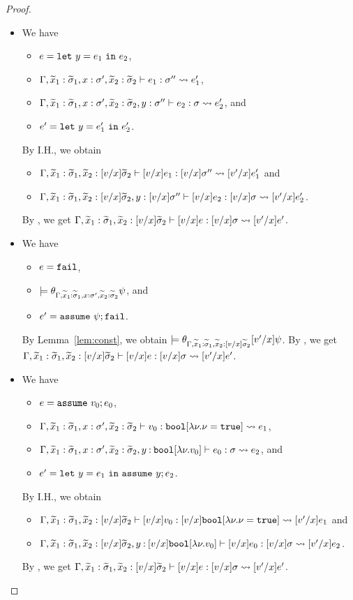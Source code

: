 \begin{proof}
\begin{itemize}
\item[] 
We have
\begin{itemize}
\item \(e=\mathtt{let~}y=e_1\mathtt{~in~}{e_2}\),
\item \(\Gamma,\widetilde{x}_1:\widetilde{\sigma}_1,x:\sigma',\widetilde{x}_2:\widetilde{\sigma}_2 \vdash e_1 : \sigma'' \leadsto e_1'\),
\item \(\Gamma,\widetilde{x}_1:\widetilde{\sigma}_1,x:\sigma',\widetilde{x}_2:\widetilde{\sigma}_2,y:\sigma'' \vdash e_2 : \sigma \leadsto e_2'\), and
\item \(e'=\mathtt{let~}y=e_1'\mathtt{~in~}{e_2'}\).
\end{itemize}
By I.H., we obtain
\begin{itemize}
\item \(\Gamma,\widetilde{x}_1:\widetilde{\sigma}_1,\widetilde{x}_2:[v/x]\widetilde{\sigma}_2 \vdash [v/x]e_1 : [v/x]\sigma'' \leadsto [v'/x]e_1'\) and
\item \(\Gamma,\widetilde{x}_1:\widetilde{\sigma}_1,\widetilde{x}_2:[v/x]\widetilde{\sigma}_2,y:[v/x]\sigma'' \vdash [v/x]e_2 : [v/x]\sigma \leadsto [v'/x]e_2'\).
\end{itemize}
By , we get
\(\Gamma,\widetilde{x}_1:\widetilde{\sigma}_1,\widetilde{x}_2:[v/x]\widetilde{\sigma}_2 \vdash [v/x]e : [v/x]\sigma \leadsto [v'/x]e'\).

\item[] 
We have
\begin{itemize}
\item \(e=\mathtt{fail}\),
\item \(\models \theta_{\Gamma,\widetilde{x}_1:\widetilde{\sigma}_1,x:\sigma',\widetilde{x}_2:\widetilde{\sigma}_2}\psi\), and
\item \(e'=\mathtt{assume~}\psi; \mathtt{fail}\).
\end{itemize}
By Lemma~\ref{lem:const}, we obtain
\(\models \theta_{\Gamma,\widetilde{x}_1:\widetilde{\sigma}_1,\widetilde{x}_2:[v/x]\widetilde{\sigma}_2}[v'/x]\psi\).
By , we get
\(\Gamma,\widetilde{x}_1:\widetilde{\sigma}_1,\widetilde{x}_2:[v/x]\widetilde{\sigma}_2 \vdash [v/x]e : [v/x]\sigma \leadsto [v'/x]e'\).

\item[] 
We have
\begin{itemize}
\item \(e=\mathtt{assume~}v_0; e_0\),
\item \(\Gamma,\widetilde{x}_1:\widetilde{\sigma}_1,x:\sigma',\widetilde{x}_2:\widetilde{\sigma}_2 \vdash v_0 : \mathtt{bool}[\lambda \nu.\nu=\mathtt{true}] \leadsto e_1\),
\item \(\Gamma,\widetilde{x}_1:\widetilde{\sigma}_1,x:\sigma',\widetilde{x}_2:\widetilde{\sigma}_2,y\mathbin{:}\mathtt{bool}[\lambda \nu.v_0] \vdash e_0 : \sigma \leadsto e_2\), and
\item \(e'=\mathtt{let~}y=e_1\mathtt{~in~}\mathtt{assume~}y; e_2\).
\end{itemize}
By I.H., we obtain
\begin{itemize}
\item \(\Gamma,\widetilde{x}_1:\widetilde{\sigma}_1,\widetilde{x}_2:[v/x]\widetilde{\sigma}_2 \vdash [v/x]v_0 : [v/x]\mathtt{bool}[\lambda \nu.\nu=\mathtt{true}] \leadsto [v'/x]e_1\) and
\item \(\Gamma,\widetilde{x}_1:\widetilde{\sigma}_1,\widetilde{x}_2:[v/x]\widetilde{\sigma}_2,y\mathbin{:}[v/x]\mathtt{bool}[\lambda \nu.v_0] \vdash [v/x]e_0 : [v/x]\sigma \leadsto [v'/x]e_2\).
\end{itemize}
By , we get
\(\Gamma,\widetilde{x}_1:\widetilde{\sigma}_1,\widetilde{x}_2:[v/x]\widetilde{\sigma}_2 \vdash [v/x]e : [v/x]\sigma \leadsto [v'/x]e'\).


\end{itemize}
\end{proof}
